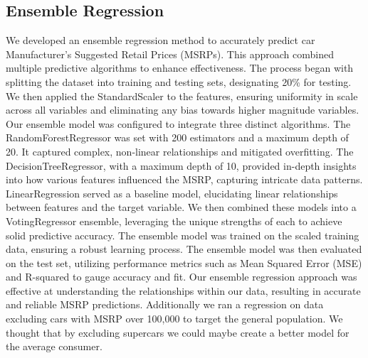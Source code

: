 \documentclass{article}
\begin{document}
\subsection{Ensemble Regression}
We developed an ensemble regression method to accurately predict car Manufacturer's Suggested Retail Prices (MSRPs). This approach combined multiple predictive algorithms to enhance effectiveness. The process began with splitting the dataset into training and testing sets, designating 20\% for testing. We then applied the StandardScaler to the features, ensuring uniformity in scale across all variables and eliminating any bias towards higher magnitude variables.
\newline
\newline
Our ensemble model was configured to integrate three distinct algorithms. The RandomForestRegressor was set with 200 estimators and a maximum depth of 20. It captured complex, non-linear relationships and mitigated overfitting. The DecisionTreeRegressor, with a maximum depth of 10, provided in-depth insights into how various features influenced the MSRP, capturing intricate data patterns. LinearRegression served as a baseline model, elucidating linear relationships between features and the target variable.
\newline
\newline
We then combined these models into a VotingRegressor ensemble, leveraging the unique strengths of each to achieve solid predictive accuracy. The ensemble model was trained on the scaled training data, ensuring a robust learning process. The ensemble model was then evaluated on the test set, utilizing performance metrics such as Mean Squared Error (MSE) and R-squared to gauge accuracy and fit. Our ensemble regression approach was effective at understanding the relationships within our data, resulting in accurate and reliable MSRP predictions. 
\newline
\newline
Additionally we ran a regression on data excluding cars with MSRP over 100,000 to target the general population. We thought that by excluding supercars we could maybe create a better model for the average consumer.
\end{document}
